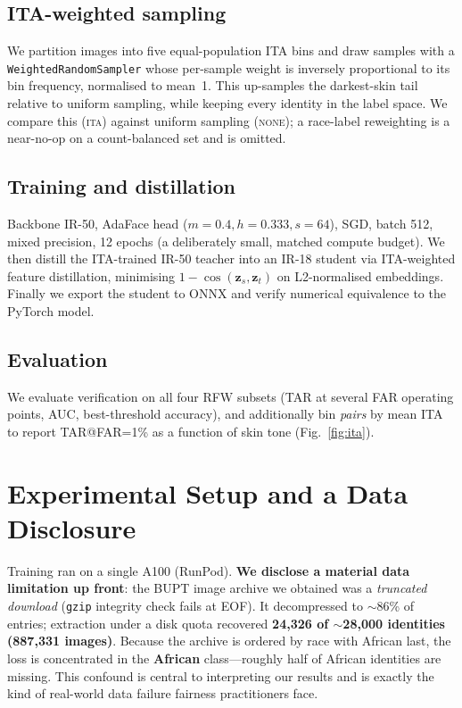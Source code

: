\documentclass[10pt,twocolumn]{article}
\begin{document}
\subsection{ITA-weighted sampling}
We partition images into five equal-population ITA bins and draw samples with a
\texttt{WeightedRandomSampler} whose per-sample weight is inversely proportional
to its bin frequency, normalised to mean~1. This up-samples the darkest-skin
tail relative to uniform sampling, while keeping every identity in the label
space. We compare this (\textsc{ita}) against uniform sampling
(\textsc{none}); a race-label reweighting is a near-no-op on a count-balanced
set and is omitted.

\subsection{Training and distillation}
Backbone IR-50, AdaFace head ($m{=}0.4,h{=}0.333,s{=}64$), SGD, batch 512,
mixed precision, 12 epochs (a deliberately small, matched compute budget). We
then distill the ITA-trained IR-50 teacher into an IR-18 student via
ITA-weighted feature distillation, minimising $1-\cos(\mathbf{z}_s,\mathbf{z}_t)$
on L2-normalised embeddings. Finally we export the student to ONNX and verify
numerical equivalence to the PyTorch model.

\subsection{Evaluation}
We evaluate verification on all four RFW subsets (TAR at several FAR operating
points, AUC, best-threshold accuracy), and additionally bin \emph{pairs} by mean
ITA to report TAR@FAR=1\% as a function of skin tone (Fig.~\ref{fig:ita}).

\section{Experimental Setup and a Data Disclosure}
Training ran on a single A100 (RunPod). \textbf{We disclose a material data
limitation up front}: the BUPT image archive we obtained was a \emph{truncated
download} (\texttt{gzip} integrity check fails at EOF). It decompressed to
\(\sim\)86\% of entries; extraction under a disk quota recovered
\textbf{24{,}326 of \(\sim\)28{,}000 identities (887{,}331 images)}. Because the
archive is ordered by race with African last, the loss is concentrated in the
\textbf{African} class---roughly half of African identities are missing. This
confound is central to interpreting our results and is exactly the kind of
real-world data failure fairness practitioners face.
\end{document}
